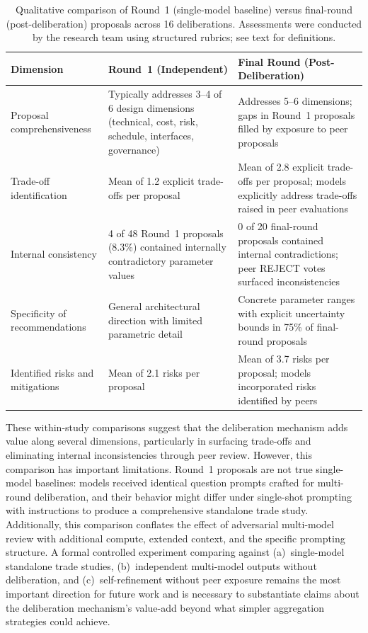 \documentclass[11pt,a4paper]{article}
\begin{document}
\begin{table}[ht]
\centering
\caption{Qualitative comparison of Round~1 (single-model baseline) versus final-round (post-deliberation) proposals across 16 deliberations. Assessments were conducted by the research team using structured rubrics; see text for definitions.}
\label{tab:baseline_comparison}
\begin{tabular}{@{}p{3.2cm}p{4.5cm}p{4.5cm}@{}}
\toprule
\textbf{Dimension} & \textbf{Round~1 (Independent)} & \textbf{Final Round (Post-Deliberation)} \\
\midrule
Proposal comprehensiveness & Typically addresses 3--4 of 6 design dimensions (technical, cost, risk, schedule, interfaces, governance) & Addresses 5--6 dimensions; gaps in Round~1 proposals filled by exposure to peer proposals \\
Trade-off identification & Mean of 1.2 explicit trade-offs per proposal & Mean of 2.8 explicit trade-offs per proposal; models explicitly address trade-offs raised in peer evaluations \\
Internal consistency & 4 of 48 Round~1 proposals (8.3\%) contained internally contradictory parameter values & 0 of 20 final-round proposals contained internal contradictions; peer REJECT votes surfaced inconsistencies \\
Specificity of recommendations & General architectural direction with limited parametric detail & Concrete parameter ranges with explicit uncertainty bounds in 75\% of final-round proposals \\
Identified risks and mitigations & Mean of 2.1 risks per proposal & Mean of 3.7 risks per proposal; models incorporated risks identified by peers \\
\bottomrule
\end{tabular}
\end{table}

These within-study comparisons suggest that the deliberation mechanism adds value along several dimensions, particularly in surfacing trade-offs and eliminating internal inconsistencies through peer review. However, this comparison has important limitations. Round~1 proposals are not true single-model baselines: models received identical question prompts crafted for multi-round deliberation, and their behavior might differ under single-shot prompting with instructions to produce a comprehensive standalone trade study. Additionally, this comparison conflates the effect of adversarial multi-model review with additional compute, extended context, and the specific prompting structure. A formal controlled experiment comparing against (a)~single-model standalone trade studies, (b)~independent multi-model outputs without deliberation, and (c)~self-refinement without peer exposure remains the most important direction for future work and is necessary to substantiate claims about the deliberation mechanism's value-add beyond what simpler aggregation strategies could achieve.
\end{document}
